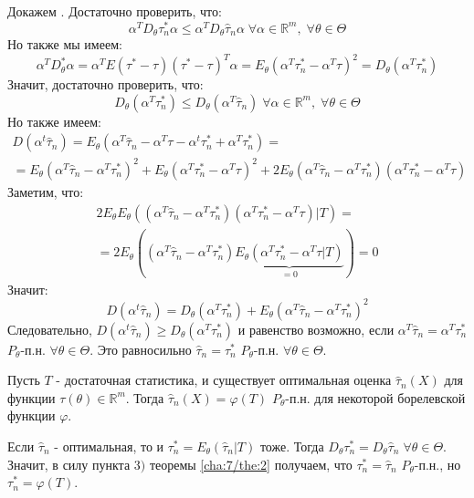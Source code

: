 \begin{Proof}
	Докажем . Достаточно проверить, что:
	$$\alpha^T D_{\theta} \tau_n^* \alpha \le \alpha^T D_{\theta} \hat{\tau}_n \alpha \; \forall \alpha \in \mathbb{R}^m, \; \forall \theta \in \Theta$$
	Но также мы имеем:
	$$\alpha^T D_{\theta}^* \alpha = \alpha^T E(\tau^* - \tau)(\tau^* - \tau)^T \alpha = E_{\theta} \left( \alpha^T \tau_n^* - \alpha^T \tau \right)^2 = D_{\theta} (\alpha^T \tau_n^*)$$
	Значит, достаточно проверить, что:
	$$D_{\theta}(\alpha^T \tau_n^*) \le D_{\theta} (\alpha^T \hat{\tau}_n) \; \forall \alpha \in \mathbb{R}^m, \; \forall \theta \in \Theta$$
	Но также имеем:
	$$\begin{gathered}
		D (\alpha^t \hat{\tau}_n) = E_{\theta} \left( \alpha^T \hat{\tau}_n - \alpha^T \tau - \alpha^t \tau_n^* + \alpha^T \tau_n^* \right) = \\
		= E_{\theta} \left( \alpha^T \hat{\tau}_n - \alpha^T \tau_n^* \right)^2 + E_{\theta} \left( \alpha^T \tau_n^* - \alpha^T \tau \right)^2 + 2 E_{\theta} \left( \alpha^T \hat{\tau}_n - \alpha^T \tau_n^* \right)\left( \alpha^T \tau_n^* - \alpha^T \tau \right)
	\end{gathered}$$
	Заметим, что:
	$$\begin{gathered}
		2 E_{\theta} E_{\theta} \left(\left( \alpha^T \hat{\tau}_n - \alpha^T \tau_n^* \right)\left( \alpha^T \tau_n^* - \alpha^T \tau \right) | T \right) = \\
		= 2 E_{\theta} \left(\left( \alpha^T \hat{\tau}_n - \alpha^T \tau_n^* \right)\underbrace{E_{\theta}\left( \alpha^T \tau_n^* - \alpha^T \tau | T \right)}_{=0} \right) = 0
	\end{gathered}$$
	Значит:
	$$D (\alpha^t \hat{\tau}_n) = D_{\theta}(\alpha^T \tau_n^*) + E_{\theta} \left( \alpha^T \hat{\tau}_n - \alpha^T \tau_n^* \right)^2$$
	Следовательно, $\displaystyle D (\alpha^t \hat{\tau}_n) \ge D_{\theta}(\alpha^T \tau_n^*)$ и равенство возможно, если $\alpha^T \hat{\tau}_n = \alpha^T \tau_n^*$ $P_{\theta}$-п.н. $\forall \theta \in \Theta$. Это равносильно $\hat{\tau}_n = \tau_n^*$ $P_{\theta}$-п.н. $\forall \theta \in \Theta$.
\end{Proof}

\begin{conseq}[]\label{cha:7/conseq:2}
	Пусть $T$ - достаточная статистика, и существует оптимальная оценка $\hat{\tau}_n(X)$ для функции $\tau (\theta) \in \mathbb{R}^m$. Тогда $\displaystyle \hat{\tau}_n (X) = \varphi(T)$ $P_{\theta}$-п.н. для некоторой борелевской функции $\varphi$.
\end{conseq}
\begin{Proof}
	Если $\hat{\tau}_n$ - оптимальная, то и $\tau_n^* = E_{\theta} (\hat{\tau}_n | T)$ тоже. Тогда $\displaystyle D_{\theta} \tau_n^* = D_{\theta} \hat{\tau}_n \; \forall \theta \in \Theta$. Значит, в силу пункта $3)$ теоремы \ref{cha:7/the:2} получаем, что $\displaystyle \tau_n^* = \hat{\tau}_n$ $P_{\theta}$-п.н., но $\tau_n^* = \varphi(T)$.
\end{Proof}

